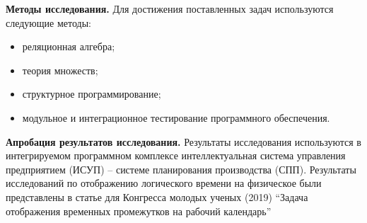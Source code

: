 \indent \textbf{Методы исследования.}
Для достижения поставленных задач используются следующие методы:
\begin{itemize}
	\item реляционная алгебра;
	\item теория множеств;
	\item структурное программирование;
	\item модульное и интеграционное тестирование программного обеспечения.
\end{itemize}

\indent \textbf{Апробация результатов исследования.}
Результаты исследования используются в интегрируемом программном комплексе интеллектуальная система управления предприятием (ИСУП) – системе планирования производства (СПП).
Результаты исследований по отображению логического времени на физическое были представлены в статье для Конгресса молодых ученых (2019) ``Задача отображения временных промежутков на рабочий календарь''